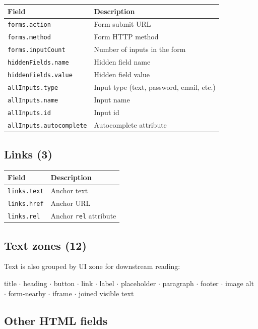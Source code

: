 \documentclass[11pt,a4paper]{article}
\begin{document}
\begin{tabular}{@{}p{4.2cm}p{9cm}@{}}
  \toprule
  \textbf{Field} & \textbf{Description} \\
  \midrule
  \texttt{forms.action} & Form submit URL \\
  \texttt{forms.method} & Form HTTP method \\
  \texttt{forms.inputCount} & Number of inputs in the form \\
  \texttt{hiddenFields.name} & Hidden field name \\
  \texttt{hiddenFields.value} & Hidden field value \\
  \texttt{allInputs.type} & Input type (text, password, email, etc.) \\
  \texttt{allInputs.name} & Input name \\
  \texttt{allInputs.id} & Input id \\
  \texttt{allInputs.autocomplete} & Autocomplete attribute \\
  \bottomrule
\end{tabular}

\subsection{Links (3)}

\begin{tabular}{@{}p{3.2cm}p{10cm}@{}}
  \toprule
  \textbf{Field} & \textbf{Description} \\
  \midrule
  \texttt{links.text} & Anchor text \\
  \texttt{links.href} & Anchor URL \\
  \texttt{links.rel} & Anchor \texttt{rel} attribute \\
  \bottomrule
\end{tabular}

\subsection{Text zones (12)}

Text is also grouped by UI zone for downstream reading:

\begin{center}
\small
title $\cdot$ heading $\cdot$ button $\cdot$ link $\cdot$ label $\cdot$ placeholder $\cdot$
paragraph $\cdot$ footer $\cdot$ image alt $\cdot$ form-nearby $\cdot$ iframe $\cdot$ joined visible text
\end{center}

\subsection{Other HTML fields}
\end{document}
